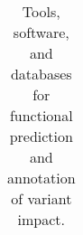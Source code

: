 \documentclass[10pt,letterpaper]{article}
\begin{document}
\begin{table}[p]
\begin{tabularx}{\textwidth}{p{3cm}XXp{1.5cm}p{1.5cm}}
 
 
  
 
 
 
 
 
 
 
 
 
 
 
 
\end{tabularx}
\caption{Tools, software, and databases for functional prediction and annotation of variant impact. }
\label{table:3}
\end{table}
 
 
\end{document}
